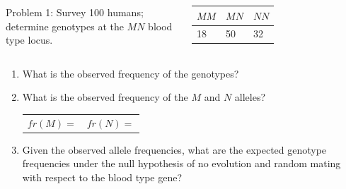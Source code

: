 \begin{noheadline}
\begin{frame}
    \small

    \begin{adjustwidth}{-1.5em}{-1.5em}
    \vspace{-0.3cm}
    \begin{columns}
    Problem 1: Survey 100 humans; determine genotypes at the $MN$ blood type
    locus.

    \begin{table}%
        \small
        \centering
        \begin{tabular}{ p{1cm} p{1cm} p{1cm} }
            \toprule
            $MM$ & {$MN$} & {$NN$} \\
            \hline
            18 & 50 & 32 \\
            \bottomrule
        \end{tabular}
    \end{table}
    \end{columns}

    \vspace{2mm}
    \begin{enumerate}
            \small
        \item What is the observed frequency of the genotypes? 

        \item What is the observed frequency of the $M$ and $N$ alleles?
        \begin{tabular}{ p{4cm} p{1cm} }
            $fr(M) = $ & $fr(N) = $ \\
        \end{tabular}
        
        \item Given the observed allele frequencies, what are the expected
            genotype frequencies under the null hypothesis of no evolution and
            random mating with respect to the blood type gene?


\end{enumerate}
\end{adjustwidth}
\end{frame}
\end{noheadline}
